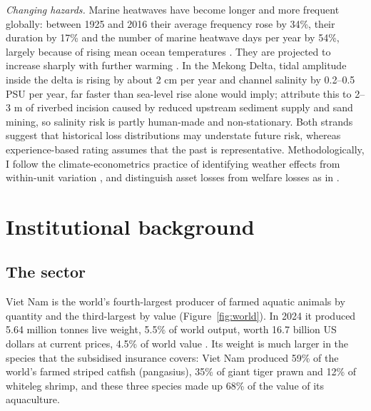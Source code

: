 \documentclass[11pt,a4paper]{article}
\begin{document}
\textit{Changing hazards.} Marine heatwaves have become longer and more frequent globally: between 1925 and 2016 their average frequency rose by 34\%, their duration by 17\% and the number of marine heatwave days per year by 54\%, largely because of rising mean ocean temperatures \parencite{oliver2018}. They are projected to increase sharply with further warming \parencite{frolicher2018}. In the Mekong Delta, tidal amplitude inside the delta is rising by about 2 cm per year and channel salinity by 0.2--0.5 PSU per year, far faster than sea-level rise alone would imply; \textcite{eslami2019} attribute this to 2--3 m of riverbed incision caused by reduced upstream sediment supply and sand mining, so salinity risk is partly human-made and non-stationary. Both strands suggest that historical loss distributions may understate future risk, whereas experience-based rating assumes that the past is representative. Methodologically, I follow the climate-econometrics practice of identifying weather effects from within-unit variation \parencite{dell2014,hsiang2016}, and distinguish asset losses from welfare losses as in \textcite{hallegatte2017}.

\section{Institutional background}
\label{sec:background}

\subsection{The sector}

Viet Nam is the world's fourth-largest producer of farmed aquatic animals by quantity and the third-largest by value (Figure~\ref{fig:world}). In 2024 it produced 5.64 million tonnes live weight, 5.5\% of world output, worth 16.7 billion US dollars at current prices, 4.5\% of world value \parencite{fao_fishstat2026}. Its weight is much larger in the species that the subsidised insurance covers: Viet Nam produced 59\% of the world's farmed striped catfish (pangasius), 35\% of giant tiger prawn and 12\% of whiteleg shrimp, and these three species made up 68\% of the value of its aquaculture.
\end{document}
